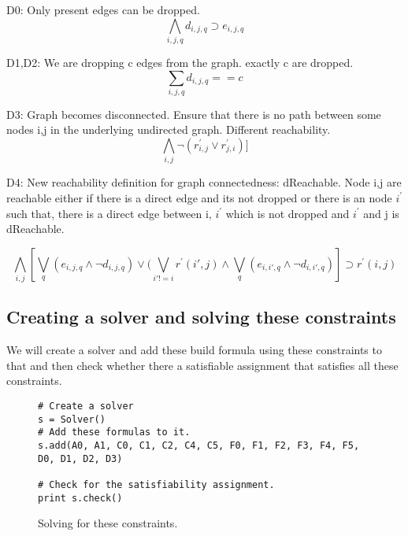 D0: Only present edges can be dropped.
\[ \bigwedge\limits_{i,j,q} d_{i,j,q} \supset e_{i,j,q}  \]

D1,D2: We are dropping c edges from the graph. exactly c are dropped.
\[ \sum_{i,j,q} d_{i,j,q} == c \]

D3:  Graph becomes disconnected. Ensure that there is no path between some nodes i,j in the underlying undirected graph. Different reachability.
\[ \bigwedge\limits_{i,j} \neg (r^{\prime}_{i,j} \lor r^{\prime}_{j,i})]  \]

D4: New reachability definition for graph connectedness: dReachable. Node i,j are reachable either if there is a direct edge and its not dropped or there is an node $i^{\prime}$ such that, there is a direct edge between i, $i^{\prime}$ which is not dropped and $i^{\prime}$ and j is dReachable.

\[ \bigwedge\limits_{i,j}  [\bigvee_{q} (e_{i,j,q} \land  \neg d_{i,j,q}) \lor  (\bigvee_{i' != i}  r^{\prime}(i',j) \land  \bigvee_{q} (e_{i,i',q} \land \neg d_{i,i',q}) ] \supset r^{\prime}(i,j)  \]

\subsection{Creating a solver and solving these constraints}
We will create a solver and add these build formula using these constraints to that and then check whether there a satisfiable assignment that satisfies all these constraints.

\begin{figure}[ht]
\begin{verbatim}
# Create a solver
s = Solver()
# Add these formulas to it.
s.add(A0, A1, C0, C1, C2, C4, C5, F0, F1, F2, F3, F4, F5, D0, D1, D2, D3)

# Check for the satisfiability assignment.
print s.check()   
\end{verbatim}
\caption{Solving for these constraints.}
\label{code:motivate}
\end{figure} 



